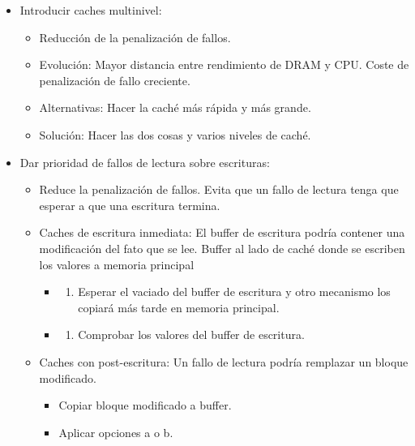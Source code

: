 \documentclass[12pt, twoside, openright]{report} %
\begin{document}
  \begin{itemize}
  
  \item
    Introducir caches multinivel:

    \begin{itemize}
    
    \item
      Reducción de la penalización de fallos.
    \item
      Evolución: Mayor distancia entre rendimiento de DRAM y CPU. Coste
      de penalización de fallo creciente.
    \item
      Alternativas: Hacer la caché más rápida y más grande.
    \item
      Solución: Hacer las dos cosas y varios niveles de caché.
    \end{itemize}
    \pagebreak
  \item
    Dar prioridad de fallos de lectura sobre escrituras:

    \begin{itemize}
    
    \item
      Reduce la penalización de fallos. Evita que un fallo de lectura
      tenga que esperar a que una escritura termina.
    \item
      Caches de escritura inmediata: El buffer de escritura podría
      contener una modificación del fato que se lee. Buffer al lado de
      caché donde se escriben los valores a memoria principal

      \begin{itemize}
      \item
        \begin{enumerate}
        \def\labelenumi{\alph{enumi})}
        
        \item
          Esperar el vaciado del buffer de escritura y otro mecanismo
          los copiará más tarde en memoria principal.
        \end{enumerate}
      \item
        \begin{enumerate}
        \def\labelenumi{\alph{enumi})}
        \setcounter{enumi}{1}
        
        \item
          Comprobar los valores del buffer de escritura.
        \end{enumerate}
      \end{itemize}
    \item
      Caches con post-escritura: Un fallo de lectura podría remplazar un
      bloque modificado.

      \begin{itemize}
      
      \item
        Copiar bloque modificado a buffer.
      \item
        Aplicar opciones a o b.
      \end{itemize}
    \end{itemize}
  \end{itemize}
\end{document}

